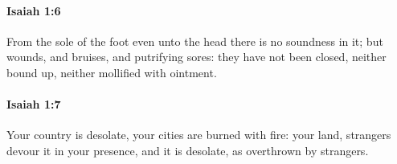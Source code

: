 		\paragraph{Isaiah 1:6} %
			\label{ISAIAH-1-6}

			From the sole of the foot even unto the head there is no soundness in it; but wounds, and bruises, and putrifying sores: they have not been closed, neither bound up, neither mollified with ointment.


		\paragraph{Isaiah 1:7} %
			\label{ISAIAH-1-7}

			Your country is desolate, your cities are burned with fire: your land, strangers devour it in your presence, and it is desolate, as overthrown by strangers.


